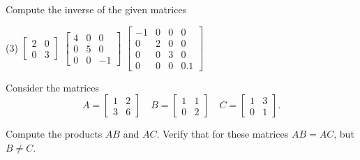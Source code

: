 \begin{exercise}\ansMark%
Compute the inverse of the given matrices
\begin{tasks}(3)
\task
$\begin{bmatrix}
2 & 0 \\
0 & 3 
\end{bmatrix}$
\task
$\begin{bmatrix}
4 & 0 & 0 \\
0 & 5 & 0 \\ 
0 & 0 & -1
\end{bmatrix}$
\task
$\begin{bmatrix}
-1 & 0 & 0 & 0 \\
0 & 2 & 0 & 0 \\ 
0 & 0 & 3 & 0 \\
0 & 0 & 0 & 0.1
\end{bmatrix}$
\end{tasks}
\end{exercise}

\begin{exercise}
Consider the matrices
\begin{equation*}
A = \begin{bmatrix} 1 & 2 \\ 3 & 6 \end{bmatrix} \quad B = \begin{bmatrix} 1 & 1 \\ 0 & 2 \end{bmatrix} \quad C = \begin{bmatrix} 1 & 3 \\ 0 & 1 \end{bmatrix}.
\end{equation*}
\begin{tasks}
\task Compute the products $AB$ and $AC$.
\task Verify that for these matrices $AB = AC$, but $B \neq C$.
\end{tasks}
\end{exercise}

